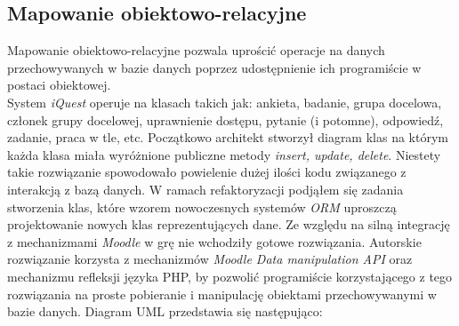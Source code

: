 \subsection{Mapowanie obiektowo-relacyjne}
Mapowanie obiektowo-relacyjne pozwala uprościć operacje na danych przechowywanych w bazie danych poprzez udostępnienie ich programiście w postaci obiektowej.\\
System \emph{iQuest} operuje na klasach takich jak: ankieta, badanie, grupa docelowa, członek grupy docelowej, uprawnienie dostępu, pytanie (i potomne), odpowiedź, zadanie, praca w tle, etc. Początkowo architekt stworzył diagram klas na którym każda klasa miała wyróżnione publiczne metody \emph{insert, update, delete}. Niestety takie rozwiązanie spowodowało powielenie dużej ilości kodu związanego z interakcją z bazą danych. W ramach refaktoryzacji podjąłem się zadania stworzenia klas, które wzorem nowoczesnych systemów \emph{ORM} uproszczą projektowanie nowych klas reprezentujących dane. Ze względu na silną integrację z mechanizmami \emph{Moodle} w grę nie wchodziły gotowe rozwiązania. Autorskie rozwiązanie korzysta z mechanizmów \emph{Moodle Data manipulation API} oraz mechanizmu refleksji języka PHP, by pozwolić programiście korzystającego z tego rozwiązania na proste pobieranie i manipulację obiektami przechowywanymi w bazie danych. Diagram UML przedstawia się następująco:
